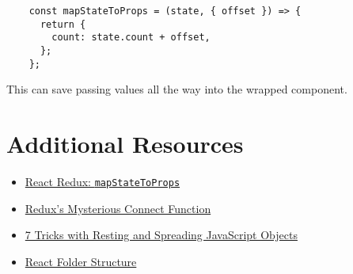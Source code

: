 \begin{verbatim}
    const mapStateToProps = (state, { offset }) => {
      return {
        count: state.count + offset,
      };
    };
\end{verbatim}

This can save passing values all the way into the wrapped component.


\section{Additional Resources}

\begin{itemize}[leftmargin=*]
    \item \href{https://react-redux.js.org/using-react-redux/connect-mapstate}{React Redux: \texttt{mapStateToProps}}
    \item \href{https://medium.com/mofed/reduxs-mysterious-connect-function-526efe1122e4}{Redux’s Mysterious Connect Function}
    \item \href{https://blog.bitsrc.io/6-tricks-with-resting-and-spreading-javascript-objects-68d585bdc83}{7 Tricks with Resting and Spreading JavaScript Objects}
    \item \href{https://www.robinwieruch.de/react-folder-structure}{React Folder Structure}
\end{itemize}
